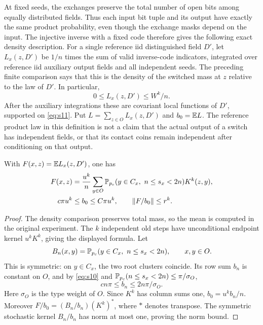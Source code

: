 At fixed seeds, the exchanges preserve the total number of open bits
among equally distributed fields.  Thus each input bit tuple and its
output have exactly the same product probability, even though the
exchange masks depend on the input.  The injective inverse with a fixed
code therefore gives the following exact density description.  For a
single reference iid distinguished field $D'$, let
$L_x(z,D')$ be $1/n$ times the sum of valid inverse-code indicators,
integrated over reference iid auxiliary output fields and all independent
seeds.  The preceding finite comparison says that this is the density
of the switched mass at $z$ relative to the law of $D'$.  In particular,
\[
 0\le L_x(z,D')\le W^k/n.
\]
After the auxiliary integrations these are covariant local functions
of $D'$, supported on \eqref{eq:s11}.  Put
$L=\sum_{z\in O}L_x(z,D')$ and $b_0=\mathbb E L$.
The reference product law in this definition is not a claim that the
actual output of a switch has independent fields, or that its contact
coins remain independent after conditioning on that output.

\begin{lemma}\label{amp:mean}
With $F(x,z)=\mathbb E L_x(z,D')$, one has
\begin{equation}\label{eq:s13}
 \begin{split}
 F(x,z)&=\frac{u^k}{n}\sum_{y\in O}
  \mathbb P_{{p_c}}(y\in C_x,\ n\le s_x<2n)K^k(z,y),\\
 c\pi u^k&\le b_0\le C\pi u^k,
 \qquad \lVert F/b_0\rVert\le r^k.
 \end{split}
\end{equation}
\end{lemma}

\begin{proof}
The density comparison preserves total mass, so the mean is computed
in the original experiment.  The $k$ independent old steps have
unconditional endpoint kernel $u^kK^k$, giving the displayed formula.
Let
\[
 B_n(x,y)=\mathbb P_{{p_c}}(y\in C_x,\ n\le s_x<2n),\qquad x,y\in O.
\]
This is symmetric: on $y\in C_x$, the two root clusters coincide.
Its row sum $b_n$ is constant on $O$, and by \eqref{eq:s10} and
$\mathbb P_{{p_c}}(n\le s_x<2n)\le\pi/\sigma_O$,
\[
 cn\pi\le b_n\le2n\pi/\sigma_O.
\]
Here $\sigma_O$ is the type weight of $O$.  Since $K^k$ has column sums
one, $b_0=u^kb_n/n$.  Moreover
$F/b_0=(B_n/b_n)(K^k)^*$, where $*$ denotes transpose.  The symmetric
stochastic kernel $B_n/b_n$ has norm at most one, proving the norm bound.
\end{proof}

